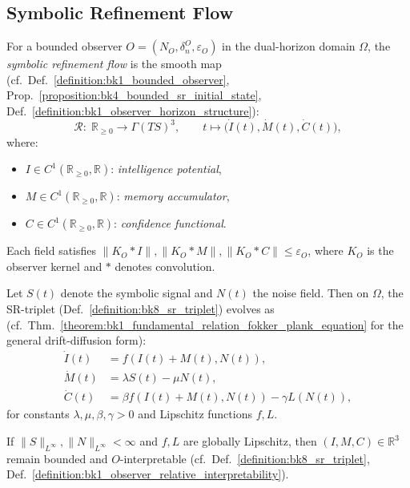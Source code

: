 \subsection{Symbolic Refinement Flow}
\label{subsec:bk8_symbolic_refinement_flow}
\begin{definition}[SR-Triplet]
\label{definition:bk8_sr_triplet}
For a bounded observer \( O = (N_O, \delta^O_n, \varepsilon_O) \) in the
dual-horizon domain \( \Omega \), the \emph{symbolic refinement flow} is the
smooth map (cf.~Def.~\ref{definition:bk1_bounded_observer},
Prop.~\ref{proposition:bk4_bounded_sr_initial_state},
Def.~\ref{definition:bk1_observer_horizon_structure}):
\[
\mathcal{R}:\;\mathbb{R}_{\geq 0} \to \Gamma(TS)^3, \qquad t \mapsto \bigl( \dot{I}(t), \dot{M}(t), \dot{C}(t) \bigr),
\]
where:
\begin{itemize}
  \item \( I \in C^1(\mathbb{R}_{\geq 0}, \mathbb{R}) \): \emph{intelligence potential},
  \item \( M \in C^1(\mathbb{R}_{\geq 0}, \mathbb{R}) \): \emph{memory accumulator},
  \item \( C \in C^1(\mathbb{R}_{\geq 0}, \mathbb{R}) \): \emph{confidence functional}.
\end{itemize}
Each field satisfies \( \| K_O * I \|, \| K_O * M \|, \| K_O * C \| \leq \varepsilon_O \), where \( K_O \) is the observer kernel and \( * \) denotes convolution.
\end{definition}
\begin{axiom}
\label{axiom:bk8_surface_energy_dynamics}
Let \( S(t) \) denote the symbolic signal and \( N(t) \) the noise field. Then on \( \Omega \), the SR-triplet (Def.~\ref{definition:bk8_sr_triplet}) evolves as (cf.~Thm.~\ref{theorem:bk1_fundamental_relation_fokker_plank_equation} for the general drift-diffusion form):
\[
\begin{aligned}
\dot{I}(t) &= f(I(t)+M(t), N(t)), \\
\dot{M}(t) &= \lambda S(t) - \mu N(t), \\
\dot{C}(t) &= \beta f(I(t)+M(t), N(t)) - \gamma L(N(t)),
\end{aligned}
\]
for constants \( \lambda, \mu, \beta, \gamma > 0 \) and Lipschitz functions \( f, L \).
\end{axiom}
\begin{proposition}[Boundedness]
\label{proposition:bk8_genetic_symbolic_resonance}
If \( \|S\|_{L^\infty}, \|N\|_{L^\infty} < \infty \) and \( f, L \) are globally Lipschitz, then \( (I, M, C) \in \mathbb{R}^3 \) remain bounded and $O$-interpretable (cf.~Def.~\ref{definition:bk8_sr_triplet}, Def.~\ref{definition:bk1_observer_relative_interpretability}).
\end{proposition}
